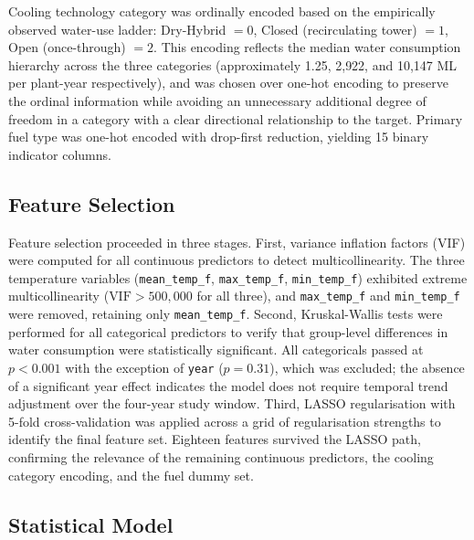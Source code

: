 \documentclass[11pt, letterpaper]{article}
\begin{document}
Cooling technology category was ordinally encoded based on the empirically observed water-use ladder: Dry-Hybrid $= 0$, Closed (recirculating tower) $= 1$, Open (once-through) $= 2$. This encoding reflects the median water consumption hierarchy across the three categories (approximately 1.25, 2{,}922, and 10{,}147 ML per plant-year respectively), and was chosen over one-hot encoding to preserve the ordinal information while avoiding an unnecessary additional degree of freedom in a category with a clear directional relationship to the target. Primary fuel type was one-hot encoded with drop-first reduction, yielding 15 binary indicator columns.

\subsection{Feature Selection}

Feature selection proceeded in three stages. First, variance inflation factors (VIF) were computed for all continuous predictors to detect multicollinearity. The three temperature variables (\texttt{mean\_temp\_f}, \texttt{max\_temp\_f}, \texttt{min\_temp\_f}) exhibited extreme multicollinearity ($\text{VIF} > 500{,}000$ for all three), and \texttt{max\_temp\_f} and \texttt{min\_temp\_f} were removed, retaining only \texttt{mean\_temp\_f}. Second, Kruskal-Wallis tests were performed for all categorical predictors to verify that group-level differences in water consumption were statistically significant. All categoricals passed at $p < 0.001$ with the exception of \texttt{year} ($p = 0.31$), which was excluded; the absence of a significant year effect indicates the model does not require temporal trend adjustment over the four-year study window. Third, LASSO regularisation with 5-fold cross-validation was applied across a grid of regularisation strengths to identify the final feature set. Eighteen features survived the LASSO path, confirming the relevance of the remaining continuous predictors, the cooling category encoding, and the fuel dummy set.

\subsection{Statistical Model}
\end{document}

